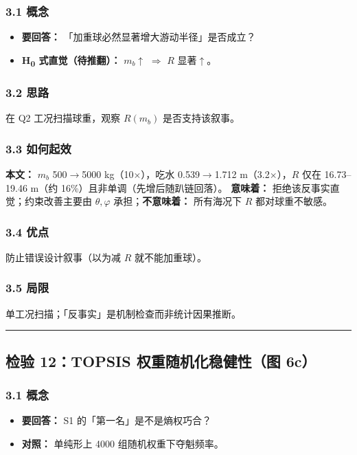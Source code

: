 \documentclass[UTF8,a4paper,zihao=-4]{ctexart}
\begin{document}
\subsubsection{\texorpdfstring{3.1 概念}{3.1 概念}}
\begin{itemize}[leftmargin=1.5em]
\item \textbf{要回答：} 「加重球必然显著增大游动半径」是否成立？
\item \textbf{H\textsubscript{0} 式直觉（待推翻）：} \(m_b\)$\uparrow$ $\Rightarrow$ \(R\) 显著$\uparrow$。
\end{itemize}

\subsubsection{\texorpdfstring{3.2 思路}{3.2 思路}}
在 Q2 工况扫描球重，观察 \(R(m_b)\) 是否支持该叙事。

\subsubsection{\texorpdfstring{3.3 如何起效}{3.3 如何起效}}
\textbf{本文：} \(m_b\) 500$\rightarrow$5000 kg（10$\times$），吃水 0.539$\rightarrow$1.712 m（3.2$\times$），\(R\) 仅在 16.73--19.46 m（约 16\%）且非单调（先增后随趴链回落）。  
\textbf{意味着：} 拒绝该反事实直觉；约束改善主要由 \(\theta,\varphi\) 承担；\textbf{不意味着：} 所有海况下 \(R\) 都对球重不敏感。

\subsubsection{\texorpdfstring{3.4 优点}{3.4 优点}}
防止错误设计叙事（以为减 \(R\) 就不能加重球）。

\subsubsection{\texorpdfstring{3.5 局限}{3.5 局限}}
单工况扫描；「反事实」是机制检查而非统计因果推断。

\vspace{0.4em}\hrule\vspace{0.4em}

\subsection{\texorpdfstring{检验 12：TOPSIS 权重随机化稳健性（图 6c）}{检验 12：TOPSIS 权重随机化稳健性（图 6c）}}

\subsubsection{\texorpdfstring{3.1 概念}{3.1 概念}}
\begin{itemize}[leftmargin=1.5em]
\item \textbf{要回答：} S1 的「第一名」是不是熵权巧合？
\item \textbf{对照：} 单纯形上 4000 组随机权重下夺魁频率。
\end{itemize}
\end{document}
